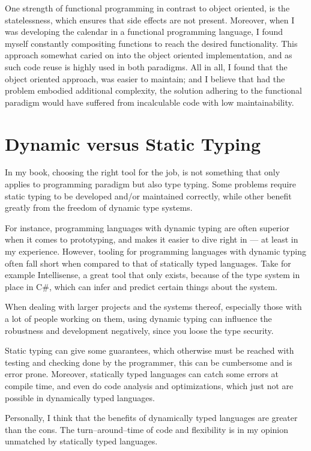 \bigskip
One strength of functional programming in contrast to object oriented, is the statelessness, which ensures that side effects are not present.
Moreover, when I was developing the calendar in a functional programming language, I found myself constantly compositing functions to reach the desired functionality.
This approach somewhat caried on into the object oriented implementation, and as such code reuse is highly used in both paradigms.
All in all, I found that the object oriented approach, was easier to maintain;
and I believe that had the problem embodied additional complexity,
the solution adhering to the functional paradigm would have suffered from incalculable code with low maintainability.

\section{Dynamic versus Static Typing}
In my book, choosing the right tool for the job, is not something that only applies to programming paradigm but also type typing.
Some problems require static typing to be developed and/or maintained correctly, while other benefit greatly from the freedom of dynamic type systems.

For instance, programming languages with dynamic typing are often superior when it comes to prototyping, and makes it easier to dive right in --- at least in my experience.
However, tooling for programming languages with dynamic typing often fall short when compared to that of statically typed languages.
Take for example Intellisense, a great tool that only exists, because of the type system in place in C\#, which can infer and predict certain things about the system.

\bigskip
When dealing with larger projects and the systems thereof, especially those with a lot of people working on them,
using dynamic typing can influence the robustness and development negatively, since you loose the type security.

Static typing can give some guarantees, which otherwise must be reached with testing and checking done by the programmer, this can be cumbersome and is error prone.
Moreover, statically typed languages can catch some errors at compile time, and even do code analysis and optimizations, which just not are possible in dynamically typed languages.

\bigskip
Personally, I think that the benefits of dynamically typed languages are greater than the cons.
The turn--around--time of code and flexibility is in my opinion unmatched by statically typed languages.

